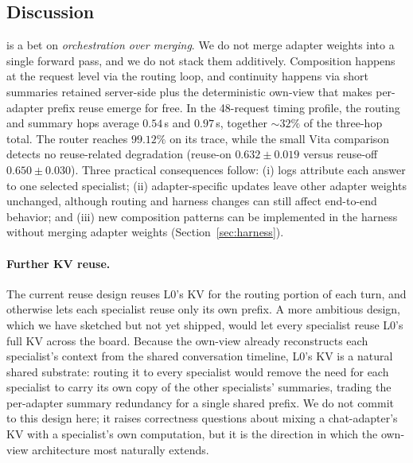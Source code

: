 \subsection{Discussion}
\label{sec:mol_discussion}

\molshort{} is a bet on \emph{orchestration over merging}. We do not merge adapter weights into a single forward pass, and we do not stack them additively. Composition happens at the request level via the routing loop, and continuity happens via short summaries retained server-side plus the deterministic own-view that makes per-adapter prefix reuse emerge for free. In the 48-request timing profile, the routing and summary hops average $0.54$\,s and $0.97$\,s, together $\sim32\%$ of the three-hop total. The router reaches $99.12\%$ on its trace, while the small Vita comparison detects no reuse-related degradation (reuse-on $0.632 \pm 0.019$ versus reuse-off $0.650 \pm 0.030$). Three practical consequences follow: (i) logs attribute each answer to one selected specialist; (ii) adapter-specific updates leave other adapter weights unchanged, although routing and harness changes can still affect end-to-end behavior; and (iii) new composition patterns can be implemented in the harness without merging adapter weights (Section~\ref{sec:harness}).

\paragraph{Further KV reuse.}
The current reuse design reuses L0's KV for the routing portion of each turn, and otherwise lets each specialist reuse only its own prefix. A more ambitious design, which we have sketched but not yet shipped, would let every specialist reuse L0's full KV across the board. Because the own-view already reconstructs each specialist's context from the shared conversation timeline, L0's KV is a natural shared substrate: routing it to every specialist would remove the need for each specialist to carry its own copy of the other specialists' summaries, trading the per-adapter summary redundancy for a single shared prefix. We do not commit to this design here; it raises correctness questions about mixing a chat-adapter's KV with a specialist's own computation, but it is the direction in which the own-view architecture most naturally extends.

